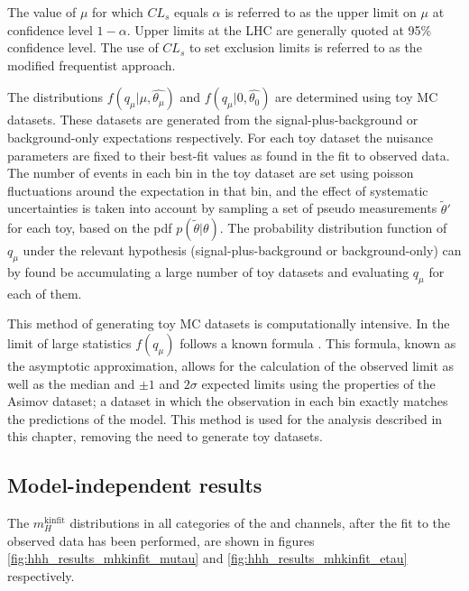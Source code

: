 The value of $\mu$ for which $CL_s$ equals $\alpha$ is referred to as the upper limit on $\mu$ at
confidence level $1-\alpha$. Upper limits at the LHC are generally
quoted at 95\% confidence level. %
The use of $CL_s$ to set exclusion limits is referred to as the modified frequentist approach\cite{CLS}.

The distributions $f(q_{\mu}|\mu,\hat{\theta_{\mu}})$ and $f(q_{\mu}|0,\hat{\theta_0})$ are determined
using toy MC datasets. These datasets are generated from the signal-plus-background or background-only expectations respectively. 
For each toy dataset the nuisance parameters are fixed to their best-fit values as found in the fit to observed data.
The number of events in each bin in the toy dataset are set using poisson fluctuations around the expectation in that bin, and the effect of
systematic uncertainties is taken into account by sampling a set of pseudo measurements $\tilde{\theta}'$ for each toy, based on the 
pdf $p(\tilde{\theta}|\theta)$.
The probability distribution function of $q_{\mu}$ under the relevant hypothesis (signal-plus-background or background-only)
can by found be accumulating a large number of toy datasets and evaluating $q_{\mu}$ for each of them.

This method of generating toy MC datasets is computationally intensive.
In the limit of large statistics $f(q_{\mu})$ follows a known formula \cite{AsymptoticFormula}.
This formula, known as the asymptotic approximation, allows for the calculation
of the observed limit as well as the median and $\pm 1$ and $2\sigma$ expected limits using
the properties of the Asimov dataset; a dataset in which the observation in 
each bin exactly matches the predictions of the model. This method is used for the analysis
described in this chapter, removing the need to generate toy datasets.

\subsection{Model-independent results}
\label{sec:hhh_results_modelindep}

The $m_{H}^{\text{kinfit}}$ distributions in all categories of the \mutau and \etau channels, after the fit to the
observed data has been performed, are shown in figures \ref{fig:hhh_results_mhkinfit_mutau} and \ref{fig:hhh_results_mhkinfit_etau} 
respectively.

